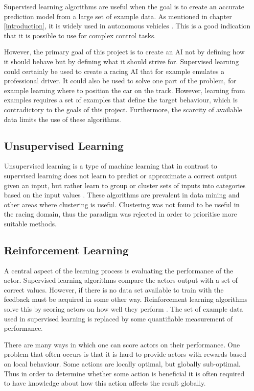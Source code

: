 Supervised learning algorithms are useful when the goal is to create an accurate prediction model from a large set of example data. As mentioned in chapter \ref{introduction}, it is widely used in autonomous vehicles \cite{Stavens, Thrun06, huval2015empirical}. This is a good indication that it is possible to use for complex control tasks.

However, the primary goal of this project is to create an AI not by defining how it should behave but by defining what it should strive for. Supervised learning could certainly be used to create a racing AI that for example emulates a professional driver. It could also be used to solve one part of the problem, for example learning where to position the car on the track. However, learning from examples requires a set of examples that define the target behaviour, which is contradictory to the goals of this project. Furthermore, the scarcity of available data limits the use of these algorithms.  

\subsection{Unsupervised Learning}
Unsupervised learning is a type of machine learning that in contrast to supervised learning does not learn to predict or approximate a correct output given an input, but rather learn to group or cluster sets of inputs into categories based on the input values \cite{glossary}. These algorithms are prevalent in data mining and other areas where clustering is useful. Clustering was not found to be useful in the racing domain, thus the paradigm was rejected in order to prioritise more suitable methods. 

\subsection{Reinforcement Learning}
\label{theory:reinforcement_learning}
A central aspect of the learning process is evaluating the performance of the actor. Supervised learning algorithms compare the actors output with a set of correct values. However, if there is no data set available to train with the feedback must be acquired in some other way. Reinforcement learning algorithms solve this by scoring actors on how well they perform \cite{whiteson}. The set of example data used in supervised learning is replaced by some quantifiable measurement of performance.

There are many ways in which one can score actors on their performance. One problem that often occurs is that it is hard to provide actors with rewards based on local behaviour. Some actions are locally optimal, but globally sub-optimal. Thus in order to determine whether some action is beneficial it is often required to have knowledge about how this action affects the result globally.

